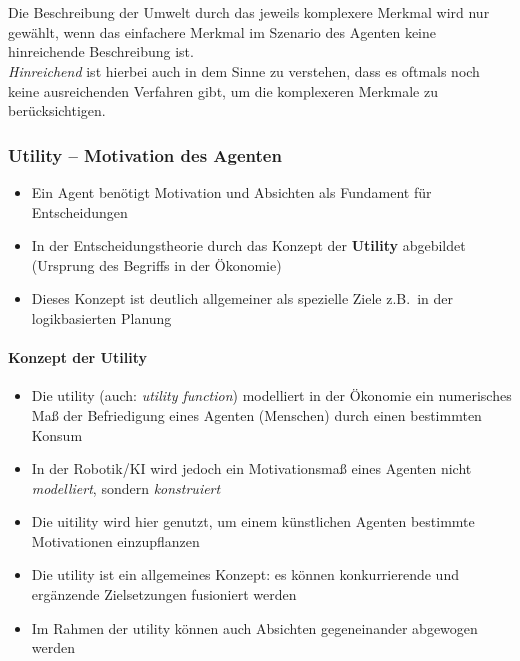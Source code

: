 \\ \\
Die Beschreibung der Umwelt durch das jeweils komplexere Merkmal wird nur gewählt, wenn das einfachere Merkmal im Szenario des Agenten keine hinreichende Beschreibung ist.\\
\textit{Hinreichend} ist hierbei auch in dem Sinne zu verstehen, dass es oftmals noch keine ausreichenden Verfahren gibt, um die komplexeren Merkmale zu berücksichtigen.

\subsubsection{Utility -- Motivation des Agenten}
\begin{itemize}
	\item Ein Agent benötigt Motivation und Absichten als Fundament für Entscheidungen
	\item In der Entscheidungstheorie durch das Konzept der \textbf{Utility} abgebildet (Ursprung des Begriffs in der Ökonomie)
	\item Dieses Konzept ist deutlich allgemeiner als spezielle Ziele z.B.\ in der logikbasierten Planung	
\end{itemize}

\paragraph{Konzept der Utility}
\begin{itemize}
	\item Die utility (auch: \textit{utility function}) modelliert in der Ökonomie ein numerisches Maß der Befriedigung eines Agenten (Menschen) durch einen bestimmten Konsum
	\item In der Robotik/KI wird jedoch ein Motivationsmaß eines Agenten nicht \emph{modelliert}, sondern \emph{konstruiert}
	\item Die uitility wird hier genutzt, um einem künstlichen Agenten bestimmte Motivationen einzupflanzen
	\item Die utility ist ein allgemeines Konzept: es können konkurrierende und ergänzende Zielsetzungen fusioniert werden
	\item Im Rahmen der utility können auch Absichten gegeneinander abgewogen werden
\end{itemize}

